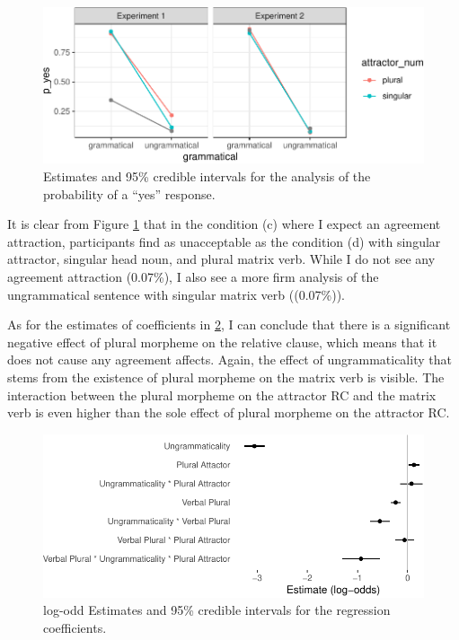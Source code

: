 \documentclass[doc]{apa6}
\begin{document}
\begin{figure}
\centering
\includegraphics{AgreementAttraction_files/figure-latex/exp2AvgResponse-1.pdf}
\caption{\label{fig:exp2AvgResponse}Estimates and 95\% credible intervals for the analysis of the probability of a \enquote{yes} response.}
\end{figure}

It is clear from Figure \ref{fig:exp2AvgResponse} that in the condition (c) where I expect an agreement attraction, participants find as unacceptable as the condition (d) with singular attractor, singular head noun, and plural matrix verb. While I do not see any agreement attraction (0.07\%), I also see a more firm analysis of the ungrammatical sentence with singular matrix verb ((0.07\%)).

As for the estimates of coefficients in \ref{fig:exp2ResponseModelPlot}, I can conclude that there is a significant negative effect of plural morpheme on the relative clause, which means that it does not cause any agreement affects. Again, the effect of ungrammaticality that stems from the existence of plural morpheme on the matrix verb is visible. The interaction between the plural morpheme on the attractor RC and the matrix verb is even higher than the sole effect of plural morpheme on the attractor RC.

\begin{figure}
\centering
\includegraphics{AgreementAttraction_files/figure-latex/exp2ResponseModelPlot-1.pdf}
\caption{\label{fig:exp2ResponseModelPlot}log-odd Estimates and 95\% credible intervals for the regression coefficients.}
\end{figure}
\end{document}
